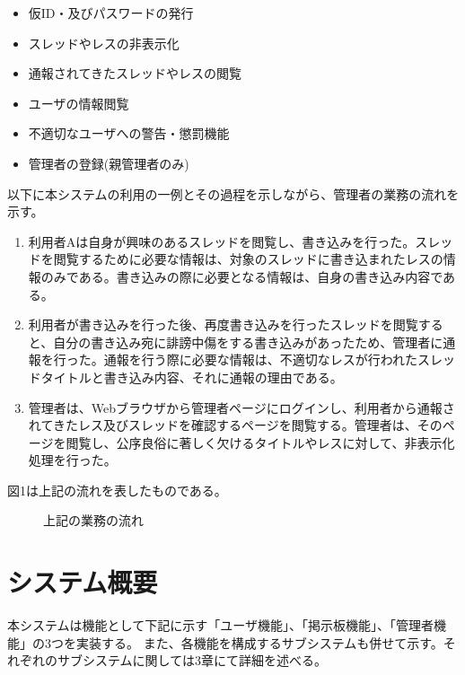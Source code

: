 \documentclass[a4j]{jarticle}
\begin{document}
\begin{itemize}
  \item 仮ID・及びパスワードの発行
  \item スレッドやレスの非表示化
  \item 通報されてきたスレッドやレスの閲覧
  \item ユーザの情報閲覧
  \item 不適切なユーザへの警告・懲罰機能
  \item 管理者の登録(親管理者のみ)
\end{itemize}





以下に本システムの利用の一例とその過程を示しながら、管理者の業務の流れを示す。

\begin{enumerate}
  \item 利用者Aは自身が興味のあるスレッドを閲覧し、書き込みを行った。スレッドを閲覧するために必要な情報は、対象のスレッドに書き込まれたレスの情報のみである。書き込みの際に必要となる情報は、自身の書き込み内容である。

  \item  利用者が書き込みを行った後、再度書き込みを行ったスレッドを閲覧すると、自分の書き込み宛に誹謗中傷をする書き込みがあったため、管理者に通報を行った。通報を行う際に必要な情報は、不適切なレスが行われたスレッドタイトルと書き込み内容、それに通報の理由である。
  \item  管理者は、Webブラウザから管理者ページにログインし、利用者から通報されてきたレス及びスレッドを確認するページを閲覧する。管理者は、そのページを閲覧し、公序良俗に著しく欠けるタイトルやレスに対して、非表示化処理を行った。
\end{enumerate}

図1は上記の流れを表したものである。


\begin{figure}[H]
\begin{center}
\caption{上記の業務の流れ}
\label{fig:figuretest}
\end{center}
\end{figure}














\section{システム概要}
本システムは機能として下記に示す「ユーザ機能」、「掲示板機能」、「管理者機能」の3つを実装する。
 また、各機能を構成するサブシステムも併せて示す。それぞれのサブシステムに関しては3章にて詳細を述べる。
\end{document}
